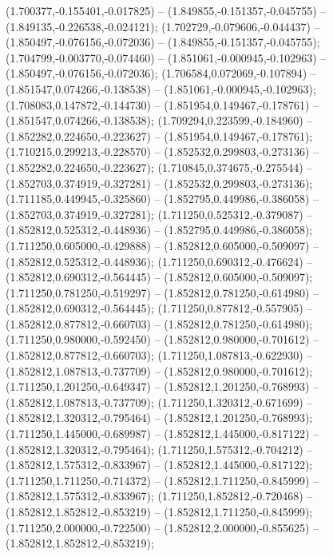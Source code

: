  (1.700377,-0.155401,-0.017825) -- (1.849855,-0.151357,-0.045755) -- (1.849135,-0.226538,-0.024121);
 (1.702729,-0.079606,-0.044437) -- (1.850497,-0.076156,-0.072036) -- (1.849855,-0.151357,-0.045755);
 (1.704799,-0.003770,-0.074460) -- (1.851061,-0.000945,-0.102963) -- (1.850497,-0.076156,-0.072036);
 (1.706584,0.072069,-0.107894) -- (1.851547,0.074266,-0.138538) -- (1.851061,-0.000945,-0.102963);
 (1.708083,0.147872,-0.144730) -- (1.851954,0.149467,-0.178761) -- (1.851547,0.074266,-0.138538);
 (1.709294,0.223599,-0.184960) -- (1.852282,0.224650,-0.223627) -- (1.851954,0.149467,-0.178761);
 (1.710215,0.299213,-0.228570) -- (1.852532,0.299803,-0.273136) -- (1.852282,0.224650,-0.223627);
 (1.710845,0.374675,-0.275544) -- (1.852703,0.374919,-0.327281) -- (1.852532,0.299803,-0.273136);
 (1.711185,0.449945,-0.325860) -- (1.852795,0.449986,-0.386058) -- (1.852703,0.374919,-0.327281);
 (1.711250,0.525312,-0.379087) -- (1.852812,0.525312,-0.448936) -- (1.852795,0.449986,-0.386058);
 (1.711250,0.605000,-0.429888) -- (1.852812,0.605000,-0.509097) -- (1.852812,0.525312,-0.448936);
 (1.711250,0.690312,-0.476624) -- (1.852812,0.690312,-0.564445) -- (1.852812,0.605000,-0.509097);
 (1.711250,0.781250,-0.519297) -- (1.852812,0.781250,-0.614980) -- (1.852812,0.690312,-0.564445);
 (1.711250,0.877812,-0.557905) -- (1.852812,0.877812,-0.660703) -- (1.852812,0.781250,-0.614980);
 (1.711250,0.980000,-0.592450) -- (1.852812,0.980000,-0.701612) -- (1.852812,0.877812,-0.660703);
 (1.711250,1.087813,-0.622930) -- (1.852812,1.087813,-0.737709) -- (1.852812,0.980000,-0.701612);
 (1.711250,1.201250,-0.649347) -- (1.852812,1.201250,-0.768993) -- (1.852812,1.087813,-0.737709);
 (1.711250,1.320312,-0.671699) -- (1.852812,1.320312,-0.795464) -- (1.852812,1.201250,-0.768993);
 (1.711250,1.445000,-0.689987) -- (1.852812,1.445000,-0.817122) -- (1.852812,1.320312,-0.795464);
 (1.711250,1.575312,-0.704212) -- (1.852812,1.575312,-0.833967) -- (1.852812,1.445000,-0.817122);
 (1.711250,1.711250,-0.714372) -- (1.852812,1.711250,-0.845999) -- (1.852812,1.575312,-0.833967);
 (1.711250,1.852812,-0.720468) -- (1.852812,1.852812,-0.853219) -- (1.852812,1.711250,-0.845999);
 (1.711250,2.000000,-0.722500) -- (1.852812,2.000000,-0.855625) -- (1.852812,1.852812,-0.853219);
